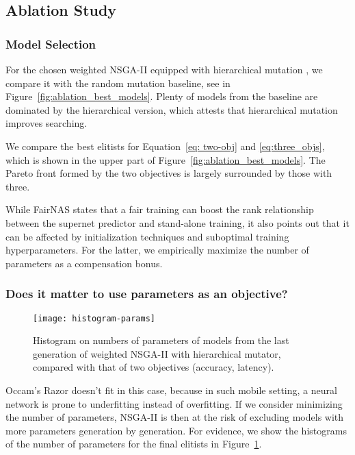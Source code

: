 \documentclass[letterpaper]{article} \usepackage{aaai20}  \usepackage{times}  \usepackage{helvet} \usepackage{courier}  \usepackage[hyphens]{url}  \usepackage{graphicx} \urlstyle{rm} \def\UrlFont{\rm}  \usepackage{graphicx}  \usepackage{amsmath}
\begin{document}
\subsection{Ablation Study}
\subsubsection{Model Selection}

For the chosen weighted NSGA-II equipped with hierarchical mutation \cite{chu2019multi}, we compare it with the random mutation baseline, see in Figure~\ref{fig:ablation_best_models}. Plenty of models from the baseline are dominated by the hierarchical version, which attests that hierarchical mutation improves searching.

We compare the best elitists for Equation~\ref{eq: two-obj} and \ref{eq:three_objs}, which is shown in the upper part of Figure~\ref{fig:ablation_best_models}. The Pareto front formed by the two objectives is largely surrounded by those with three.  

While FairNAS states that a fair training can boost the rank relationship between the supernet predictor and stand-alone training, it also points out that it can be affected by initialization techniques and suboptimal training hyperparameters. For the latter, we empirically maximize the number of parameters as a compensation bonus. 

\subsubsection{Does it matter to use parameters as an objective?}

\begin{figure}[ht]
\centering
{
\texttt{[image: histogram-params]}
}
\caption{Histogram on numbers of parameters of models from the last generation of weighted NSGA-II with hierarchical mutator,  compared with that of two objectives (accuracy, latency).}
\label{fig:histogram-params}
\end{figure}


Occam's Razor doesn't fit in this case, because in such mobile setting, a neural network is prone to underfitting instead of overfitting. If we consider minimizing the number of parameters, NSGA-II is then at the risk of excluding models with more parameters generation by generation. For evidence, we show the histograms of the number of parameters for the final elitists in Figure~\ref{fig:histogram-params}. 
 
\end{document}
